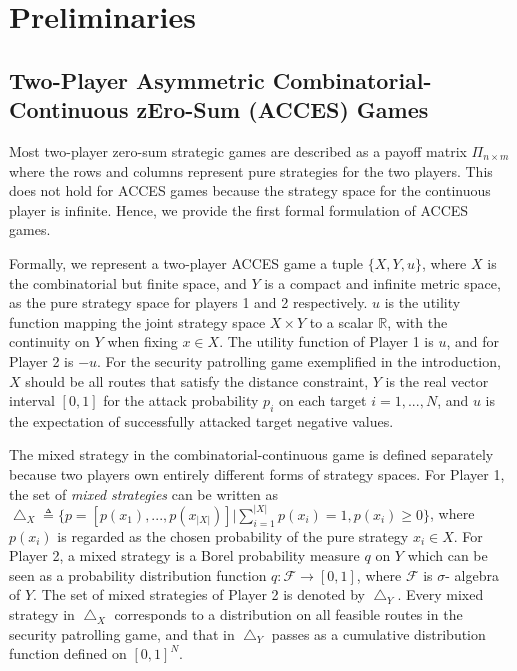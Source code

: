 \section{Preliminaries}

\subsection{Two-Player Asymmetric Combinatorial-Continuous zEro-Sum (ACCES) Games}

Most two-player zero-sum strategic games are described as a payoff matrix $\Pi_{n\times m}$ where the rows and columns represent pure strategies for the two players. This does not hold for ACCES games because the strategy space for the continuous player is infinite. Hence, we provide the first formal formulation of ACCES games.


Formally, we represent a two-player ACCES game a tuple $\{X, Y, u\}$, where $X$ is the combinatorial but finite space, and $Y$ is a compact and infinite metric space, as the pure strategy space for players 1 and 2 respectively. $u$ is the utility function mapping the joint strategy space $X \times Y$ to a scalar $\mathbb{R}$, with the continuity on $Y$ when fixing $x \in X$. The utility function of Player 1 is $u$, and for Player 2 is $-u$. For the security patrolling game exemplified in the introduction, $X$ should be all routes that satisfy the distance constraint, $Y$ is the real vector interval $[0, 1]$ for the attack probability $p_i$ on each target $i=1,...,N$, and $u$ is the expectation of successfully attacked target negative values. 


The mixed strategy in the combinatorial-continuous game is defined separately because two players own entirely different forms of strategy spaces. For Player 1, the set of \textit{mixed strategies} can be written as $\bigtriangleup_{X} \triangleq \{p = [p(x_1), ..., p(x_{|X|})] | \sum_{i=1}^{|X|} p(x_i) = 1, p(x_i) \geq 0 \}$, where $p(x_i)$ is regarded as the chosen probability of the pure strategy $x_i \in X$. For Player 2, a mixed strategy is a Borel probability measure $q$ on $Y$ which can be seen as a probability distribution function $q:\mathcal{F} \rightarrow [0, 1]$, where $\mathcal{F}$ is $\sigma$- algebra of $Y$. The set of mixed strategies of Player 2 is denoted by $\bigtriangleup_{Y}$. Every mixed strategy in $\bigtriangleup_{X}$ corresponds to a distribution on all feasible routes in the security patrolling game, and that in $\bigtriangleup_{Y}$ passes as a cumulative distribution function defined on $[0, 1]^N$.

